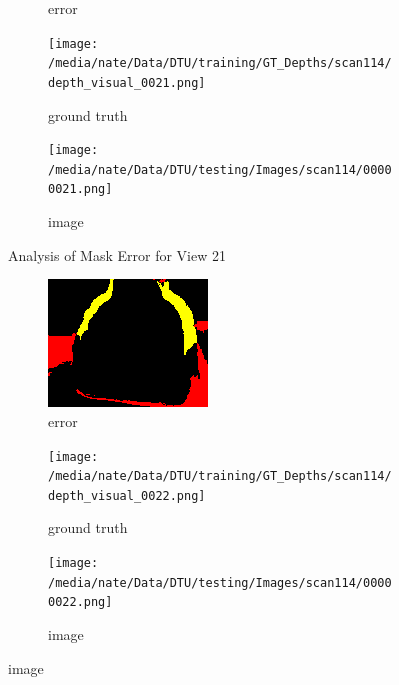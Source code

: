 \documentclass{article}
\begin{document}
\begin{figure}
\begin{subfigure}{0.3\textwidth}
		\caption{error}
		\label{fig:error21}
	\end{subfigure}
	\hfill
	\centering
	\begin{subfigure}{0.3\textwidth}
		\centering
		\texttt{[image: /media/nate/Data/DTU/training/GT\_Depths/scan114/depth\_visual\_0021.png]}
		\caption{ground truth}
		\label{fig:gt21}
	\end{subfigure}
	\hfill
	\centering
	\begin{subfigure}{0.3\textwidth}
		\centering
		\texttt{[image: /media/nate/Data/DTU/testing/Images/scan114/00000021.png]}
		\caption{image}
		\label{fig:img21}
	\end{subfigure}
	\hfill
	\caption{Analysis of Mask Error for View 21}
	\label{fig:error_analys21}
\end{figure}\begin{figure}
	\centering
	\begin{subfigure}{0.3\textwidth}
		\centering
		\includegraphics[width=\textwidth]{./output/022_error.png}
		\caption{error}
		\label{fig:error22}
	\end{subfigure}
	\hfill
	\centering
	\begin{subfigure}{0.3\textwidth}
		\centering
		\texttt{[image: /media/nate/Data/DTU/training/GT\_Depths/scan114/depth\_visual\_0022.png]}
		\caption{ground truth}
		\label{fig:gt22}
	\end{subfigure}
	\hfill
	\centering
	\begin{subfigure}{0.3\textwidth}
		\centering
		\texttt{[image: /media/nate/Data/DTU/testing/Images/scan114/00000022.png]}
		\caption{image}

\end{subfigure}
\end{figure}
\end{document}
